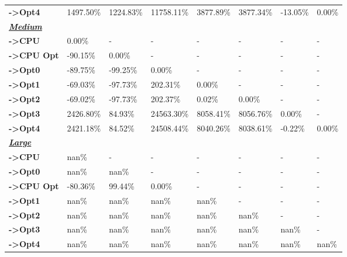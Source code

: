 \begin{table}[H]
\begin{tabular}{llllllll}
    \rowcolor[HTML]{EFEFEF} \cellcolor[HTML]{DAE8FC} \textbf{->Opt4} & 1497.50\% & 1224.83\% & 11758.11\% & 3877.89\% & 3877.34\% & 	-13.05\% & 	0.00\% \\
    \cellcolor[HTML]{DAE8FC} \textbf{\textbf{{\emph{{\underline{{Medium}}}}}}} &  &  &  &  &  &  &  \\
    \rowcolor[HTML]{EFEFEF} \cellcolor[HTML]{DAE8FC} \textbf{->CPU} & 0.00\% & - & - & - & - & - & - \\
    \cellcolor[HTML]{DAE8FC} \textbf{->CPU Opt} & -90.15\% & 0.00\% & - & - & - & - & - \\
    \rowcolor[HTML]{EFEFEF} \cellcolor[HTML]{DAE8FC} \textbf{->Opt0} & -89.75\% & -99.25\% & 0.00\% & - & - & - & - \\
    \cellcolor[HTML]{DAE8FC} \textbf{->Opt1} & -69.03\% & -97.73\% & 202.31\% & 0.00\% & - & - & - \\
    \rowcolor[HTML]{EFEFEF} \cellcolor[HTML]{DAE8FC} \textbf{->Opt2} & -69.02\% & -97.73\% & 202.37\% & 0.02\% & 0.00\% & - & - \\
    \cellcolor[HTML]{DAE8FC} \textbf{->Opt3} & 2426.80\% & 84.93\% & 24563.30\% & 8058.41\% & 8056.76\% & 	0.00\% & - \\
    \rowcolor[HTML]{EFEFEF} \cellcolor[HTML]{DAE8FC} \textbf{->Opt4} & 2421.18\% & 84.52\% & 24508.44\% & 8040.26\% & 8038.61\% & 	-0.22\% & 	0.00\% \\
    \cellcolor[HTML]{DAE8FC} \textbf{\textbf{{\emph{{\underline{{Large}}}}}}} &  &  &  &  &  &  &  \\
    \rowcolor[HTML]{EFEFEF} \cellcolor[HTML]{DAE8FC} \textbf{->CPU} & nan\% & - & - & - & - & - & - \\
    \cellcolor[HTML]{DAE8FC} \textbf{->Opt0} & nan\% & nan\% & - & - & - & - & - \\
    \rowcolor[HTML]{EFEFEF} \cellcolor[HTML]{DAE8FC} \textbf{->CPU Opt} & -80.36\% & 99.44\% & 0.00\% & - & - & - & - \\
    \cellcolor[HTML]{DAE8FC} \textbf{->Opt1} & nan\% & nan\% & nan\% & nan\% & - & - & - \\
    \rowcolor[HTML]{EFEFEF} \cellcolor[HTML]{DAE8FC} \textbf{->Opt2} & nan\% & nan\% & nan\% & nan\% & nan\% & - & - \\
    \cellcolor[HTML]{DAE8FC} \textbf{->Opt3} & nan\% & nan\% & nan\% & nan\% & nan\% & 	nan\% & - \\
    \rowcolor[HTML]{EFEFEF} \cellcolor[HTML]{DAE8FC} \textbf{->Opt4} & nan\% & nan\% & nan\% & nan\% & nan\% & 	nan\% & 	nan\% \\

\end{tabular}
\end{table}
